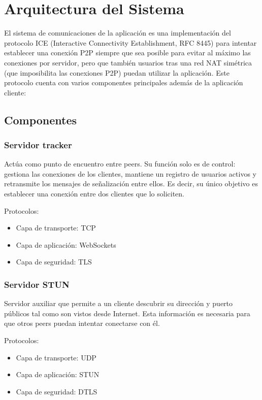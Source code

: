 \documentclass{article}
\begin{document}
  \section{Arquitectura del Sistema}
    El sistema de comunicaciones de la aplicación es una implementación del protocolo ICE (Interactive Connectivity Establishment, RFC 8445) para intentar establecer una conexión P2P siempre que sea posible para evitar al máximo las conexiones por servidor, pero que también usuarios tras una red NAT simétrica (que imposibilita las conexiones P2P) puedan utilizar la aplicación. Este protocolo cuenta con varios componentes principales además de la aplicación cliente:
    
    \subsection{Componentes}
    \subsubsection{Servidor tracker}
    Actúa como punto de encuentro entre peers. Su función solo es de control: gestiona las conexiones de los clientes, mantiene un registro de usuarios activos y retransmite los mensajes de señalización entre ellos. Es decir, su único objetivo es establecer una conexión entre dos clientes que lo soliciten. \vspace{1em}
    
    Protocolos:
    
    \begin{itemize}
       \item Capa de transporte: TCP
       \item Capa de aplicación: WebSockets
       \item Capa de seguridad: TLS
    \end{itemize}

    
    \subsubsection{Servidor STUN}
    Servidor auxiliar que permite a un cliente descubrir su dirección y puerto públicos tal como son vistos desde Internet. Esta información es necesaria para que otros peers puedan intentar conectarse con él. \vspace{1em}
    
    Protocolos:
    
    \begin{itemize}
       \item Capa de transporte: UDP
       \item Capa de aplicación: STUN
       \item Capa de seguridad: DTLS
    \end{itemize}
    
\end{document}
